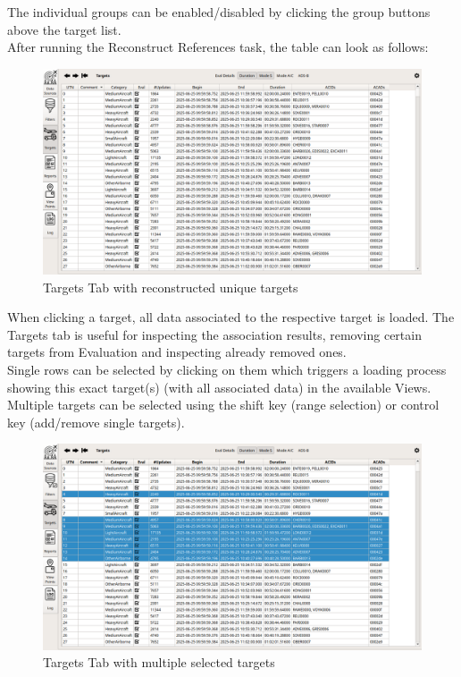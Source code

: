 The individual groups can be enabled/disabled by clicking the group buttons above the target list. \\

After running the Reconstruct References task, the table can look as follows:

\begin{figure}[H]
  \hspace*{-2cm}
    \includegraphics[width=18cm,frame]{figures/ui_targets2.png}
  \caption{Targets Tab with reconstructed unique targets}
\end{figure}

When clicking a target, all data associated to the respective target is loaded. The Targets tab is useful for inspecting the association results, removing certain targets from Evaluation and inspecting already removed ones. \\

Single rows can be selected by clicking on them which triggers a loading process showing this exact target(s) (with all associated data) in the available Views. 
Multiple targets can be selected using the shift key (range selection) or control key (add/remove single targets).

\begin{figure}[H]
  \hspace*{-2cm}
    \includegraphics[width=18cm,frame]{figures/ui_targets3.png}
  \caption{Targets Tab with multiple selected targets}
\end{figure}

